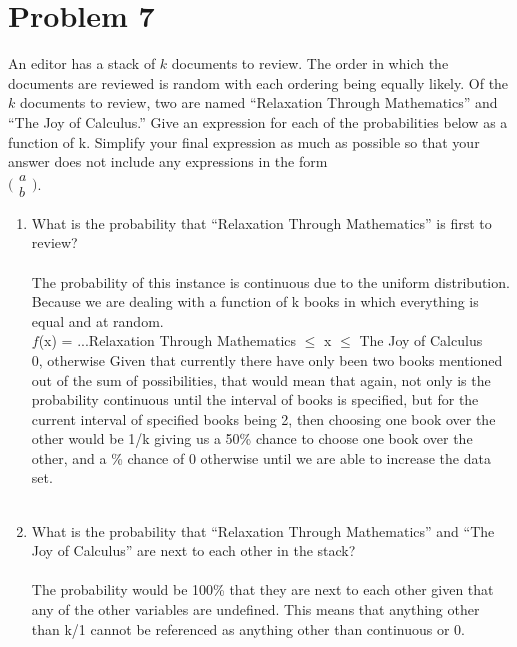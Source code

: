 \section*{Problem 7}
An editor has a stack of $k$ documents to review.  The order in which the documents are reviewed is random with each ordering being equally likely. Of the $k$ documents to review, two are named ``Relaxation Through Mathematics'' and ``The Joy of Calculus.'' Give an expression for each of the probabilities below as a function of k. Simplify your final expression as much as possible so that your answer does not include any expressions in the form\\
$
\Big(
 \begin{array}{c}
 a\\
 b
    \end{array}
    \Big)
$.
 \begin{enumerate}[label=(\alph*)]
\item What is the probability that ``Relaxation Through Mathematics'' is first to review?\\\\
The probability of this instance is continuous due to the uniform distribution. Because we are dealing with a function of k books in which everything is equal and at random. \\ $f$(x) = ...Relaxation Through Mathematics $\leq$ x $\leq$ The Joy of Calculus \\
0, otherwise
Given that currently there have only been two books mentioned out of the sum of possibilities, that would mean that again, not only is the probability continuous until the interval of books is specified, but for the current interval of specified books being 2, then choosing one book over the other would be 1/k giving us a 50\% chance to choose one book over the other, and a \% chance of 0 otherwise until we are able to increase the data set.
\\\\
\item What is the probability that ``Relaxation Through Mathematics'' and ``The Joy of Calculus'' are next to each other in the stack?\\\\
The probability would be 100\% that they are next to each other given that any of the other variables are undefined. This means that anything other than k/1 cannot be referenced as anything other than continuous or 0.
\\\\
\end{enumerate}



